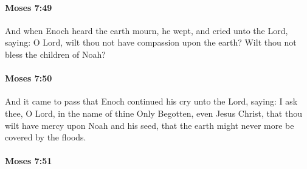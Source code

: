 
		\paragraph{Moses 7:49} %
			\label{MOSES-7-49}

			And when Enoch heard the earth mourn, he wept, and cried unto the Lord, saying: O Lord, wilt thou not have compassion upon the earth? Wilt thou not bless the children of Noah?


		\paragraph{Moses 7:50} %
			\label{MOSES-7-50}

			And it came to pass that Enoch continued his cry unto the Lord, saying: I ask thee, O Lord, in the name of thine Only Begotten, even Jesus Christ, that thou wilt have mercy upon Noah and his seed, that the earth might never more be covered by the floods.


		\paragraph{Moses 7:51} %
			\label{MOSES-7-51}

